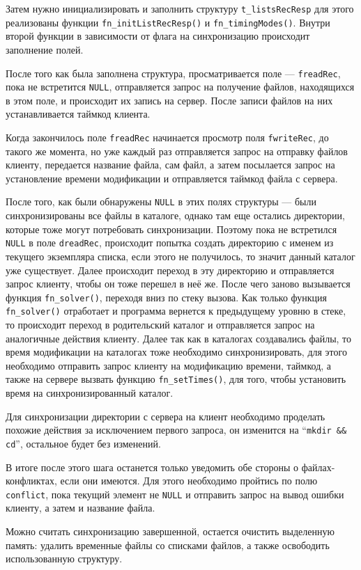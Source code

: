 Затем нужно инициализировать и заполнить структуру \verb|t_listsRecResp| для этого реализованы функции \verb|fn_initListRecResp()| и \verb|fn_timingModes()|.
Внутри второй функции в зависимости от флага на синхронизацию происходит заполнение полей.

После того как была заполнена структура, просматривается поле --- \verb|freadRec|, пока не встретится \verb|NULL|, отправляется запрос на получение файлов, находящихся в этом поле, и происходит их запись на сервер. После записи файлов на них устанавливается таймкод клиента.

Когда закончилось поле \verb|freadRec| начинается просмотр поля \verb|fwriteRec|, до такого же момента, но уже каждый раз отправляется запрос на отправку файлов клиенту, передается название файла, сам файл, а затем посылается запрос на установление времени модификации и отправляется таймкод файла с сервера.

После того, как были обнаружены \verb|NULL| в этих полях структуры --- были синхронизированы все файлы в каталоге, однако там еще остались директории, которые тоже могут потребовать синхронизации. Поэтому пока не встретился \verb|NULL| в поле \verb|dreadRec|, происходит попытка создать директорию с именем из текущего экземпляра списка, если этого не получилось, то значит данный каталог уже существует. Далее происходит переход в эту директорию и отправляется запрос клиенту, чтобы он тоже перешел в неё же. После чего заново вызывается функция \verb|fn_solver()|, переходя вниз по стеку вызова. Как только функция \verb|fn_solver()| отработает и программа вернется к предыдущему уровню в стеке, то происходит переход в родительский каталог и отправляется запрос на аналогичные действия клиенту. Далее так как в каталогах создавались файлы, то время модификации на каталогах тоже необходимо синхронизировать, для этого необходимо отправить запрос клиенту на модификацию времени, таймкод, а также на сервере вызвать функцию \verb|fn_setTimes()|, для того, чтобы установить время на синхронизированный каталог.

Для синхронизации директории с сервера на клиент необходимо проделать похожие действия за исключением первого запроса, он изменится на ``\verb|mkdir && cd|'', остальное будет без изменений.

В итоге после этого шага останется только уведомить обе стороны о файлах-конфликтах, если они имеются. Для этого необходимо пройтись по полю \verb|conflict|, пока текущий элемент не \verb|NULL| и отправить запрос на вывод ошибки клиенту, а затем и название файла.

Можно считать синхронизацию завершенной, остается очистить выделенную память: удалить временные файлы со списками файлов, а также освободить использованную структуру.

